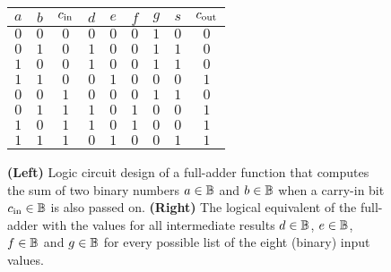 \begin{figure}
\begin{minipage}[c]{.6\linewidth}
    \end{minipage}
    \hfill
    \begin{minipage}[c]{.38\linewidth}
        \centering
        \begin{tabular}{c|c|c||c|c|c|c|c|c}
            $a$ & $b$ & $c_{\mathrm{in}}$ & $d$ & $e$ & $f$ & $g$ & $s$ & $c_{\mathrm{out}}$ \\
            \hline
            $0$ & $0$ & $0$    & $0$ & $0$ & $0$ & $1$ & $0$ & $0$     \\
            $0$ & $1$ & $0$    & $1$ & $0$ & $0$ & $1$ & $1$ & $0$     \\
            $1$ & $0$ & $0$    & $1$ & $0$ & $0$ & $1$ & $1$ & $0$     \\
            $1$ & $1$ & $0$    & $0$ & $1$ & $0$ & $0$ & $0$ & $1$     \\
            $0$ & $0$ & $1$    & $0$ & $0$ & $0$ & $1$ & $1$ & $0$     \\
            $0$ & $1$ & $1$    & $1$ & $0$ & $1$ & $0$ & $0$ & $1$     \\
            $1$ & $0$ & $1$    & $1$ & $0$ & $1$ & $0$ & $0$ & $1$     \\
            $1$ & $1$ & $1$    & $0$ & $1$ & $0$ & $0$ & $1$ & $1$     \\
        \end{tabular}
    \end{minipage}
    \caption{{\bf (Left)} Logic circuit design of a full-adder function that computes the sum of two binary numbers $a \in \mathbb{B}$ and $b \in \mathbb{B}$ when a carry-in bit $c_{\mathrm{in}} \in \mathbb{B}$ is also passed on. {\bf (Right)} The logical equivalent of the full-adder with the values for all intermediate results $d \in \mathbb{B}$, $e \in \mathbb{B}$, $f \in \mathbb{B}$ and $g \in \mathbb{B}$ for every possible list of the eight (binary) input values. \label{fig:full-adder}}
\end{figure}

